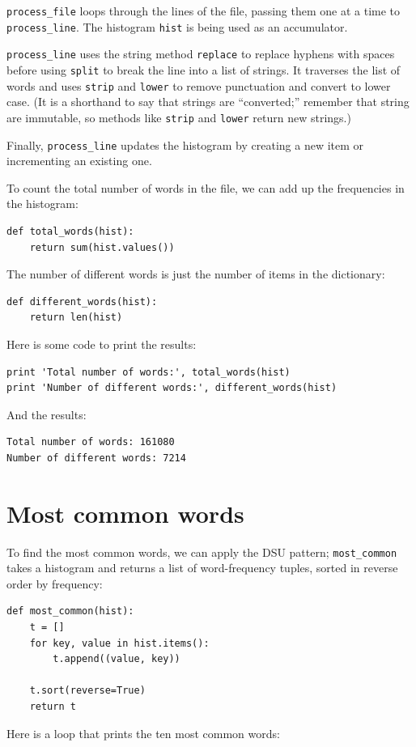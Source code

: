 \documentclass[10pt]{book}
\begin{document}
\verb"process_file" loops through the lines of the file,
passing them one at a time to \verb"process_line".  The histogram
{\tt hist} is being used as an accumulator.

\verb"process_line" uses the string method {\tt replace} to replace
hyphens with spaces before using {\tt split} to break the line into a
list of strings.  It traverses the list of words and uses {\tt strip}
and {\tt lower} to remove punctuation and convert to lower case.  (It
is a shorthand to say that strings are ``converted;'' remember that
string are immutable, so methods like {\tt strip} and {\tt lower}
return new strings.)

Finally, \verb"process_line" updates the histogram by creating a new
item or incrementing an existing one.

To count the total number of words in the file, we can add up
the frequencies in the histogram:

\begin{verbatim}
def total_words(hist):
    return sum(hist.values())
\end{verbatim}
%
The number of different words is just the number of items in
the dictionary:

\begin{verbatim}
def different_words(hist):
    return len(hist)
\end{verbatim}
%
Here is some code to print the results:

\begin{verbatim}
print 'Total number of words:', total_words(hist)
print 'Number of different words:', different_words(hist)
\end{verbatim}
%
And the results:

\begin{verbatim}
Total number of words: 161080
Number of different words: 7214
\end{verbatim}
%

\section{Most common words}

To find the most common words, we can apply the DSU pattern;
\verb"most_common" takes a histogram and returns a list of
word-frequency tuples, sorted in reverse order by frequency:

\begin{verbatim}
def most_common(hist):
    t = []
    for key, value in hist.items():
        t.append((value, key))

    t.sort(reverse=True)
    return t
\end{verbatim}
%
Here is a loop that prints the ten most common words:
\end{document}
